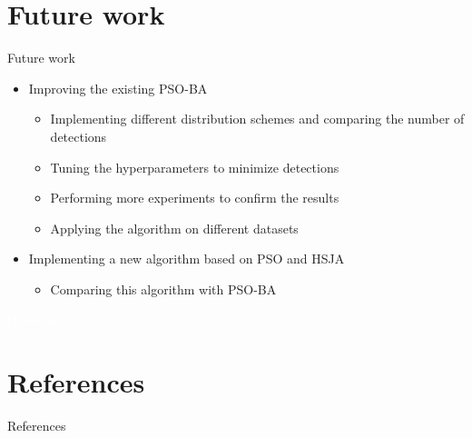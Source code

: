 \documentclass[11pt,t]{beamer}
\begin{document}
\section{Future work}
\begin{frame}{Future work}
\begin{itemize}
	\item Improving the existing PSO-BA
	\begin{itemize}
		\item Implementing different distribution schemes and comparing the number of detections
		\item Tuning the hyperparameters to minimize detections
		\item Performing more experiments to confirm the results
		\item Applying the algorithm on different datasets
	\end{itemize}
	\item Implementing a new algorithm based on PSO and HSJA
	\begin{itemize}
		\item Comparing this algorithm with PSO-BA
	\end{itemize}
\end{itemize}
\end{frame}

\begin{frame}

\centering
\textcolor{white}{Questions?}
\end{frame}

\appendix
\section*{References}
\begin{frame}[allowframebreaks]{References}


\end{frame}
\end{document}
